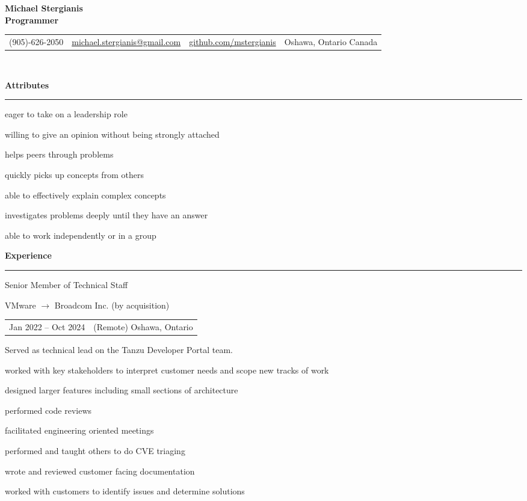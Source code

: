 \documentclass[letterpaper]{article}
\makeatletter
\newcommand{\primary}{\color{primary}}
\newcommand{\primarydark}{\color{primarydark}}
\newcommand{\complementary}{\color{complementary}}
\newcommand{\mapMarker}{\faMapMarker*[alt]}
\newcommand{\email}
{\faEnvelope \space \href{mailto:michaelstergianis@gmail.com}{michael.stergianis@gmail.com}}
\newcommand{\github}
{\faGithub \space \href{https://github.com/mstergianis}{github.com/mstergianis}}
\newcommand{\phone}
{\faPhone \space (905)-626-2050}
\newcommand{\location}
{\mapMarker \space Oshawa, Ontario Canada}
\newenvironment{heading}[1]{%
  {\LARGE \primarydark \textbf{#1}}\\ {\complementary
    \rule[5pt]{\linewidth}{0.6pt}}
}
{\par\vspace{8pt}}
\newenvironment{experience}[4]{
  { #1 \par}
  {\small \primary #2 \par}
  \begin{tabularx}{\linewidth}{ l l }
    { \small \faCalendar \space #3 } & { \small \mapMarker \space #4 }
  \end{tabularx}%
}{
  \vspace{8pt}
}
\newenvironment{itemize*}%
{\begin{itemize}[topsep=0pt,leftmargin=20pt]%
    \setlength{\itemsep}{0pt}%
    \setlength{\parsep}{0pt}%
    \setlength{\parskip}{0pt}%
    \small%
  }%
  {\end{itemize}}
\makeatother
\begin{document}
{\huge \textbf{Michael Stergianis}}\\
{\large \primary \textbf{Programmer}}
\\

\begin{tabularx}{\linewidth}{ l l l l }
  \phone & \email & \github & \location \\
\end{tabularx}\\

\begin{minipage}[t]{0.58\textwidth}%
  \begin{heading}{Attributes}
    \begin{itemize*}
    \item eager to take on a leadership role
    \item willing to give an opinion without being strongly attached
    \item helps peers through problems
    \item quickly picks up concepts from others
    \item able to effectively explain complex concepts
    \item investigates problems deeply until they have an answer
    \item able to work independently or in a group
    \end{itemize*}
  \end{heading}
  \begin{heading}{Experience}%
    \begin{experience}{Senior Member of Technical Staff}
      {VMware \(\rightarrow\) Broadcom Inc. (by acquisition)}
      {Jan 2022 -- Oct 2024}
      {(Remote) Oshawa, Ontario}
      Served as technical lead on the Tanzu Developer Portal team.
      \begin{itemize*}
      \item worked with key stakeholders to interpret customer needs and scope
        new tracks of work
      \item designed larger features including small sections of architecture
      \item performed code reviews
      \item facilitated engineering oriented meetings
      \item performed and taught others to do CVE triaging
      \item wrote and reviewed customer facing documentation
      \item worked with customers to identify issues and determine solutions

\end{itemize*}
\end{experience}
\end{heading}
\end{minipage}
\end{document}
